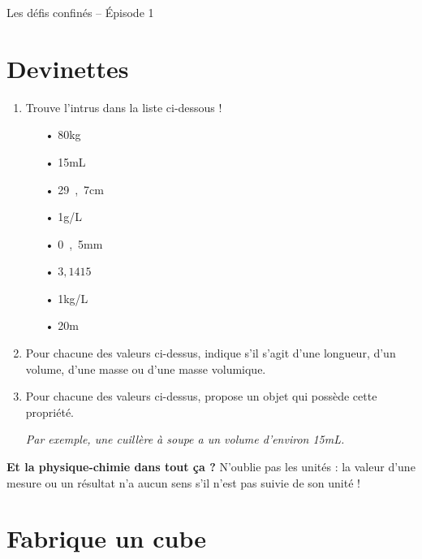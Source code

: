 \documentclass[12pt,a4paper]{article}
\begin{document}
\begin{header}
Les défis confinés -- Épisode 1
\end{header}

\section*{Devinettes}

\begin{enumerate}
\item Trouve l'intrus dans la liste ci-dessous !
\begin{multicols}{4}
\begin{itemize}
\item[•] \unit{80}{kg}
\item[•] \unit{15}{mL}
\item[•] \unit{29{,}7}{cm}
\item[•] \unit{1}{g/L}
\item[•] \unit{0{,}5}{mm}
\item[•] $3{,}1415$
\item[•] \unit{1}{kg/L}
\item[•] \unit{20}{m\cubed}
\end{itemize}
\end{multicols}

\item Pour chacune des valeurs ci-dessus, indique s'il s'agit d'une longueur, d'un volume, d'une masse ou d'une masse volumique.

\item Pour chacune des valeurs ci-dessus, propose un objet qui possède cette propriété.

\textit{Par exemple, une cuillère à soupe a un volume d'environ \unit{15}{mL}.}
\end{enumerate}
\textbf{Et la physique-chimie dans tout ça ?}
N'oublie pas les unités : la valeur d'une mesure ou un résultat n'a aucun sens s'il n'est pas suivie de son unité !

\section*{Fabrique un cube}
\end{document}
